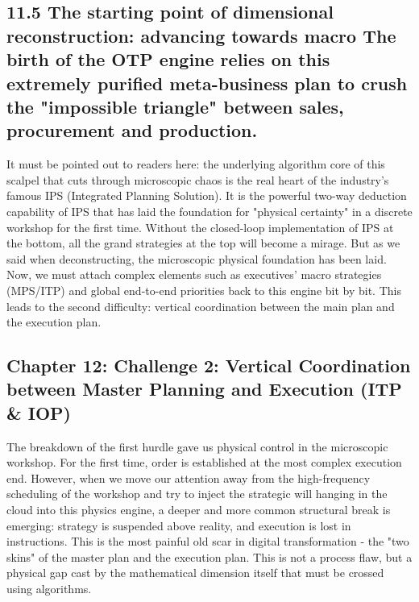 \documentclass[11pt,a4paper]{article}
\begin{document}
\subsection*{11.5 The starting point of dimensional reconstruction: advancing towards macro The birth of the OTP engine relies on this extremely purified meta-business plan to crush the "impossible triangle" between sales, procurement and production.}


It must be pointed out to readers here: the underlying algorithm core of this scalpel that cuts through microscopic chaos is the real heart of the industry's famous IPS (Integrated Planning Solution). It is the powerful two-way deduction capability of IPS that has laid the foundation for "physical certainty" in a discrete workshop for the first time. Without the closed-loop implementation of IPS at the bottom, all the grand strategies at the top will become a mirage. But as we said when deconstructing, the microscopic physical foundation has been laid. Now, we must attach complex elements such as executives’ macro strategies (MPS/ITP) and global end-to-end priorities back to this engine bit by bit. This leads to the second difficulty: vertical coordination between the main plan and the execution plan.

\subsection*{Chapter 12: Challenge 2: Vertical Coordination between Master Planning and Execution (ITP \& IOP)}
The breakdown of the first hurdle gave us physical control in the microscopic workshop. For the first time, order is established at the most complex execution end. However, when we move our attention away from the high-frequency scheduling of the workshop and try to inject the strategic will hanging in the cloud into this physics engine, a deeper and more common structural break is emerging: strategy is suspended above reality, and execution is lost in instructions. This is the most painful old scar in digital transformation - the "two skins" of the master plan and the execution plan. This is not a process flaw, but a physical gap cast by the mathematical dimension itself that must be crossed using algorithms.
\end{document}
